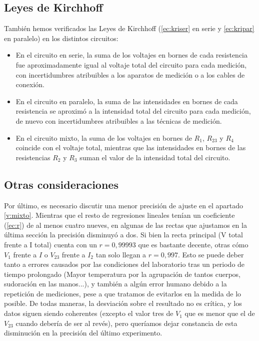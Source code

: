 \documentclass[12pt, a4paper, titlepage]{article}
\begin{document}
  \subsection{Leyes de Kirchhoff}

  También hemos verificados las Leyes de Kirchhoff (\ref{ec:kriser} en serie y \ref{ec:kripar} en paralelo) en los distintos circuitos:

  \begin{itemize}[label=$-$]
    \item En el circuito en serie, la suma de los voltajes en bornes de cada resistencia fue aproximadamente igual al voltaje total del circuito para cada medición, con incertidumbres atribuibles a los aparatos de medición o a los cables de conexión.
    \item En el circuito en paralelo, la suma de las intensidades en bornes de cada resistencia se aproximó a la intensidad total del circuito para cada medición, de nuevo con incertidumbres atribuibles a las técnicas de medición.
    \item En el circuito mixto, la suma de los voltajes en bornes de $R_1$, $R_{23}$ y $R_4$ coincide con el voltaje total, mientras que las intensidades en bornes de las resistencias $R_2$ y $R_3$ suman el valor de la intensidad total del circuito.
  \end{itemize}

  \subsection{Otras consideraciones}

  Por último, es necesario discutir una menor precisión de ajuste en el apartado \ref{v:mixto}. Mientras que el resto de regresiones lineales tenían un coeficiente (\ref{ec:r}) de al menos cuatro nueves, en algunas de las rectas que ajustamos en la última sección la precisión disminuyó a dos. Si bien la recta principal (V total frente a I total) cuenta con un $r = 0,99993$ que es bastante decente, otras cómo $V_1$ frente a $I$ o $V_{23}$ frente a $I_2$ tan solo llegan a $r = 0,997$. Esto se puede deber tanto a errores causados por las condiciones del laboratorio tras un periodo de tiempo prolongado (Mayor temperatura por la agrupación de tantos cuerpos, sudoración en las manos...), y también a algún error humano debido a la repetición de mediciones, pese a que tratamos de evitarlos en la medida de lo posible. De todas maneras, la desviación sobre el resultado no es crítica, y los datos siguen siendo coherentes (excepto el valor tres de $V_1$ que es menor que el de $V_23$ cuando debería de ser al revés), pero queríamos dejar constancia de esta disminución en la precisión del último experimento.
\end{document}
